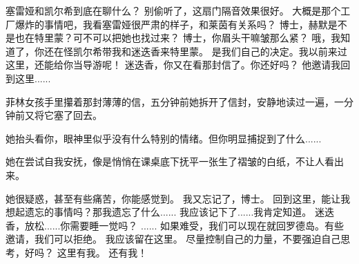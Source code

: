 \documentclass[openany]{book}
\begin{document}
\begin{dialogue}
     塞雷娅和凯尔希到底在聊什么？
     别偷听了，这扇门隔音效果很好。
     大概是那个工厂爆炸的事情吧，我看塞雷娅很严肃的样子，和莱茵有关系吗？
     博士，赫默是不是也在特里蒙？可不可以把她也找过来？
     博士，你眉头干嘛皱那么紧？
     哦，我知道了，你还在怪凯尔希带我和迷迭香来特里蒙。
     是我们自己的决定。我以前来过这里，还能给你当导游呢！
     迷迭香，你又在看那封信了。你还好吗？
     他邀请我回到这里......\par
    菲林女孩手里攥着那封薄薄的信，五分钟前她拆开了信封，安静地读过一遍，一分钟前又将它塞了回去。\par
    她抬头看你，眼神里似乎没有什么特别的情绪。但你明显捕捉到了什么......\par
    她在尝试自我安抚，像是悄悄在课桌底下抚平一张生了褶皱的白纸，不让人看出来。\par
    她很疑惑，甚至有些痛苦，你能感觉到。
     我又忘记了，博士。
     回到这里，能让我想起遗忘的事情吗？那我遗忘了什么......
     我应该记下了......我肯定知道。
     迷迭香，放松......你需要睡一觉吗？
     ......
     如果难受，我们可以现在就回罗德岛。有些邀请，我们可以拒绝。
     我应该留在这里。
     尽量控制自己的力量，不要强迫自己思考，好吗？
     这里有我。
     还有我！
\end{dialogue}
\end{document}

